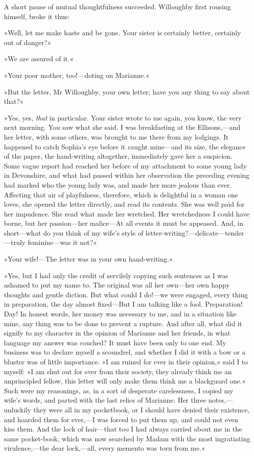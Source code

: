 A short pause of mutual thoughtfulness succeeded. Willoughby first rousing himself, broke it thus:

»Well, let me make haste and be gone. Your sister is certainly better, certainly out of danger?«

»We are assured of it.«

»Your poor mother, too!—doting on Marianne.«

»But the letter, Mr Willoughby, your own letter; have you any thing to say about that?«

»Yes, yes, \textit{that} in particular. Your sister wrote to me again, you know, the very next morning. You saw what she said. I was breakfasting at the Ellisons,—and her letter, with some others, was brought to me there from my lodgings. It happened to catch Sophia’s eye before it caught mine—and its size, the elegance of the paper, the hand-writing altogether, immediately gave her a suspicion. Some vague report had reached her before of my attachment to some young lady in Devonshire, and what had passed within her observation the preceding evening had marked who the young lady was, and made her more jealous than ever. Affecting that air of playfulness, therefore, which is delightful in a woman one loves, she opened the letter directly, and read its contents. She was well paid for her impudence. She read what made her wretched. Her wretchedness I could have borne, but her passion—her malice—At all events it must be appeased. And, in short—what do you think of my wife’s style of letter-writing?—delicate—tender—truly feminine—was it not?«

»Your wife!—The letter was in your own hand-writing.«

»Yes, but I had only the credit of servilely copying such sentences as I was ashamed to put my name to. The original was all her own—her own happy thoughts and gentle diction. But what could I do!—we were engaged, every thing in preparation, the day almost fixed—But I am talking like a fool. Preparation! Day! In honest words, her money was necessary to me, and in a situation like mine, any thing was to be done to prevent a rupture. And after all, what did it signify to my character in the opinion of Marianne and her friends, in what language my answer was couched? It must have been only to one end. My business was to declare myself a scoundrel, and whether I did it with a bow or a bluster was of little importance. »I am ruined for ever in their opinion,« said I to myself: »I am shut out for ever from their society, they already think me an unprincipled fellow, this letter will only make them think me a blackguard one.« Such were my reasonings, as, in a sort of desperate carelessness, I copied my wife’s words, and parted with the last relics of Marianne. Her three notes,—unluckily they were all in my pocketbook, or I should have denied their existence, and hoarded them for ever,—I was forced to put them up, and could not even kiss them. And the lock of hair—that too I had always carried about me in the same pocket-book, which was now searched by Madam with the most ingratiating virulence,—the dear lock,—all, every memento was torn from me.«

